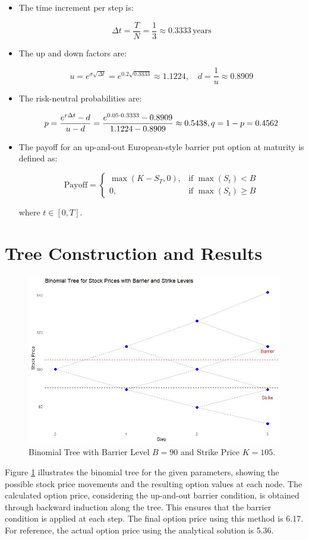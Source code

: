 \begin{itemize}
    \item The time increment per step is:
    
    \[
    \Delta t = \frac{T}{N} = \frac{1}{3} \approx 0.3333 \, \text{years}
    \]

    \item The up and down factors are:
    
    \[
    u = e^{\sigma \sqrt{\Delta t}} = e^{0.2 \sqrt{0.3333}} \approx 1.1224, \quad d = \frac{1}{u} \approx 0.8909
    \]

    \item The risk-neutral probabilities are:
    
    \[
    p = \frac{e^{r \Delta t} - d}{u - d} = \frac{e^{0.05 \cdot 0.3333} - 0.8909}{1.1224 - 0.8909} \approx 0.5438, \\ q = 1 - p = 0.4562
    \]

    \item The payoff for an up-and-out European-style barrier put option at maturity is defined as:

    \[ 
    \text{Payoff} = 
    \begin{cases} 
    \max(K - S_T, 0), & \text{if } \max(S_t) < B \\ 
    0, & \text{if } \max(S_t) \geq B 
    \end{cases}
    \]

    where \(t \in [0, T]\).
    
\end{itemize}


\section{Tree Construction and Results}
\begin{figure}[h]
    \centering
    \includegraphics[width=.75\linewidth]{content/images/three-step.jpg}
    \caption{Binomial Tree with Barrier Level \(B = 90\) and Strike Price \(K = 105\).}
    \label{fig:binomial-tree}
\end{figure}
Figure \ref{fig:binomial-tree} illustrates the binomial tree for the given parameters, showing the possible stock price movements and the resulting option values at each node. The calculated option price, considering the up-and-out barrier condition, is obtained through backward induction along the tree. This ensures that the barrier condition is applied at each step. The final option price using this method is 6.17. For reference, the actual option price using the analytical solution is 5.36.

